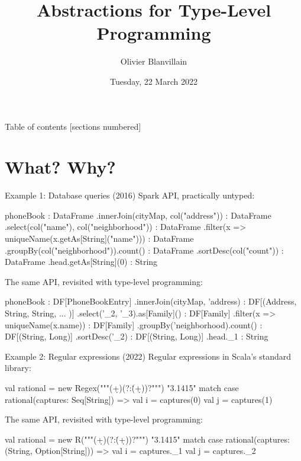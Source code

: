 \documentclass[10pt]{beamer}
\title{Abstractions for Type-Level Programming}
\date{Tuesday, 22 March 2022}
\author{Olivier Blanvillain}
\newenvironment{slide}[2][]
  {\begin{frame}[fragile,environment=slide,#1]{#2}}
  {\end{frame}}
\begin{document}
\maketitle

\begin{frame}{Table of contents}
  [sections numbered]
  \tableofcontents
\end{frame}

\section[Type-Level Programming\\What? Why?]{What? Why?}

\begin{slide}{Example 1: Database queries (2016)}
Spark API, practically untyped:
\begin{code}
phoneBook                                           : DataFrame
  .innerJoin(cityMap, col("address"))               : DataFrame
  .select(col("name"), col("neighborhood"))         : DataFrame
  .filter(x => uniqueName(x.getAs[String]("name"))) : DataFrame
  .groupBy(col("neighborhood")).count()             : DataFrame
  .sortDesc(col("count"))                           : DataFrame
  .head.getAs[String](0)                            : String
\end{code}
\pause
The same API, revisited with type-level programming:
\begin{code}
phoneBook                          : DF[PhoneBookEntry]
  .innerJoin(cityMap, 'address)    : DF[(Address, String, String, ... )]
  .select('_2, '_3).as[Family]()   : DF[Family]
  .filter(x => uniqueName(x.name)) : DF[Family]
  .groupBy('neighborhood).count()  : DF[(String, Long)]
  .sortDesc('_2)                   : DF[(String, Long)]
  .head._1                         : String
\end{code}
\end{slide}

\begin{slide}{Example 2: Regular expressions (2022)}
Regular expressions in Scala's standard library:
\begin{code}
val rational = new Regex("""(\d+)(?:\.(\d+))?""")
"3.1415" match
  case rational(captures: Seq[String]) =>
    val i = captures(0)
    val j = captures(1)
\end{code}
\pause
The same API, revisited with type-level programming:
\begin{code}
val rational = new R("""(\d+)(?:\.(\d+))?""")
"3.1415" match
  case rational(captures: (String, Option[String])) =>
    val i = captures._1
    val j = captures._2
\end{code}
\end{slide}
\end{document}
